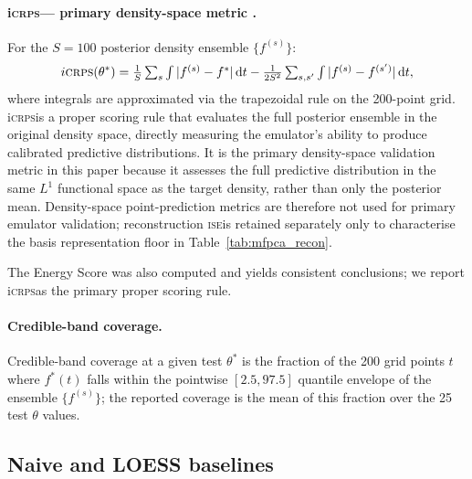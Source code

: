 \documentclass[12pt,a4paper]{article}
\newcommand{\ISE}{\textsc{ise}}
\newcommand{\iCRPS}{i\textsc{crps}}
\newcommand{\spar}{\theta}
\begin{document}
\paragraph{\iCRPS --- primary density-space metric \citep{gneiting2007}.}
For the $S=100$ posterior density ensemble $\{f^{(s)}\}$:
\begin{equation}
  \iCRPS(\spar^*)=
    \tfrac{1}{S}\textstyle\sum_s\int|f^{(s)}-f^*|\,\mathrm{d}t
    -\tfrac{1}{2S^2}\textstyle\sum_{s,s'}\int|f^{(s)}-f^{(s')}|
    \,\mathrm{d}t,
  \label{eq:icrps}
\end{equation}
where integrals are approximated via the trapezoidal rule on the
200-point grid.  \iCRPS is a proper scoring rule that evaluates the
full posterior ensemble in the original density space, directly
measuring the emulator's ability to produce calibrated predictive
distributions.  It is the primary density-space validation metric in
this paper because it assesses the full predictive distribution in the
same $L^1$ functional space as the target density, rather than only the
posterior mean.  Density-space point-prediction metrics are therefore
not used for primary emulator validation; reconstruction \ISE is
retained separately only to characterise the basis representation floor
in Table~\ref{tab:mfpca_recon}.

The Energy Score \citep{gneiting2007} was also computed and yields
consistent conclusions; we report \iCRPS as the primary proper scoring
rule.

\paragraph{Credible-band coverage.}
Credible-band coverage at a given test $\spar^*$ is the fraction of the
200 grid points $t$ where $f^*(t)$ falls within the pointwise
$[2.5,97.5]$ quantile envelope of the ensemble $\{f^{(s)}\}$; the
reported coverage is the mean of this fraction over the 25 test $\spar$
values.

\subsection{Naive and LOESS baselines}
\label{sec:naive}
\end{document}
